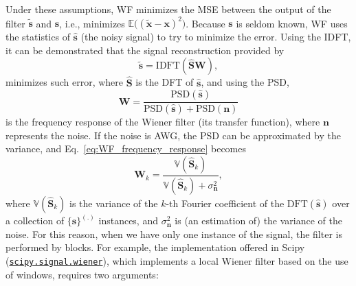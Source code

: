 Under these assumptions, \gls{WF} minimizes the \gls{MSE} between the
output of the filter $\tilde{\mathbf{s}}$ and $\mathbf{s}$, i.e.,
minimizes $\mathbb{E}\big((\tilde{\mathbf{x}} -
\mathbf{x})^2\big)$. Because $\mathbf{s}$ is seldom known, \gls{WF}
uses the statistics of $\hat{\mathbf{s}}$ (the noisy signal) to try to
minimize the error. Using the \gls{IDFT}, it can be demonstrated
\cite{wiener1942extrapolation} that the signal reconstruction provided
by
\begin{equation}
  \tilde{\mathbf{s}} = \text{IDFT}(\hat{\mathbf{S}}\mathbf{W}),
  \label{eq:WF}
\end{equation}
minimizes such error, where $\hat{\mathbf{S}}$ is the \gls{DFT} of
$\hat{\mathbf{s}}$, and using the \gls{PSD},
\begin{equation}
  \mathbf{W} = \frac{\text{PSD}(\hat{\mathbf{s}})}{\text{PSD}(\hat{\mathbf{s}}) + \text{PSD}(\mathbf{n})}
  \label{eq:WF_frequency_response}
\end{equation}
is the frequency response of the Wiener filter (its transfer
function), where $\mathbf{n}$ represents the noise. If the noise is
\gls{AWG}, the \gls{PSD} can be approximated by the
variance, and Eq.~\ref{eq:WF_frequency_response} becomes
\begin{equation}
  \mathbf{W}_k = \frac{\mathbb{V}(\hat{\mathbf{S}}_k)}{\mathbb{V}(\hat{\mathbf{S}}_k) + \sigma^2_{\mathbf{n}}},
  \label{eq:WF_coeffs}
\end{equation}
where $\mathbb{V}(\hat{\mathbf{S}}_k)$ is the variance of the $k$-th
Fourier coefficient of the $\text{DFT}(\hat{\mathbf{s}})$ over a
collection of $\{\hat{\mathbf{s}}\}^{(.)}$ instances, and
$\sigma^2_{\mathbf{n}}$ is (an estimation of) the variance of the
noise. For this reason, when we have only one instance of the signal,
the filter is performed by blocks. For example, the implementation
offered in Scipy
(\href{https://docs.scipy.org/doc/scipy/reference/generated/scipy.signal.wiener.html}{\texttt{scipy.signal.wiener}}),
which implements a local Wiener filter based on the use of windows,
requires two arguments:
